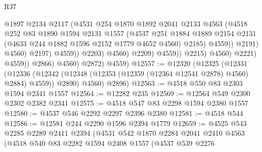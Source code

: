 \begin{lexlean}{R37}
\begin{coremodule}
                                          @1897
                                          @2134
                                          @2117
                                          (@4531
                                            @254
                                            @1870
                                            @1892
                                            @2041
                                            @2133
                                            @4563
                                            (@4518
                                              @252
                                              @83
                                              @1890
                                              @1594
                                              @2131
                                              @1557
                                              (@4537
                                                @251
                                                @1884
                                                @1889
                                                @2154
                                                @2131
                                                (@4633 @244 @1882 @1596 @2152 @1779 @4652 @4560)
                                                @2185)
                                              @4559))
                                          @2191)
                                        @4560)
                                      @2197)
                                    @4559))
                                @2203)
                              @4560)
                            @2209)
                          @4559))
                      @2215)
                    @4560)
                  @2221)
                @4559))
            @2866)
          @4560)
        @2872)
      @4559)
@12557 := @12320
    (@12325
      (@12331
        (@12336 (@12342 (@12348 (@12353 (@12359 (@12364 @12541 @2878) @4560) @2884) @4559)) @2890)
        @4560)
      @2896)
@12563 := @4518 @550 @83 @2303 @1594 @2341 @1557
@12564 := @12282 @235
@12569 := @12564 @549 @2300 @2302 @2382 @2341
@12575 := @4518 @547 @83 @2298 @1594 @2380 @1557
@12580 := @4537 @546 @2292 @2297 @2396 @2380
@12581 := @4518 @544
@12586 := @12581 @244 @2290 @1596 @2394 @1779
@12659 := @4525
    @543
    @2285
    @2289
    @2411
    @2394
    (@4531
      @542
      @1870
      @2284
      @2041
      @2410
      @4563
      (@4518
        @540
        @83
        @2282
        @1594
        @2408
        @1557
        (@4537
          @539
          @2276

\end{coremodule}
\end{lexlean}
